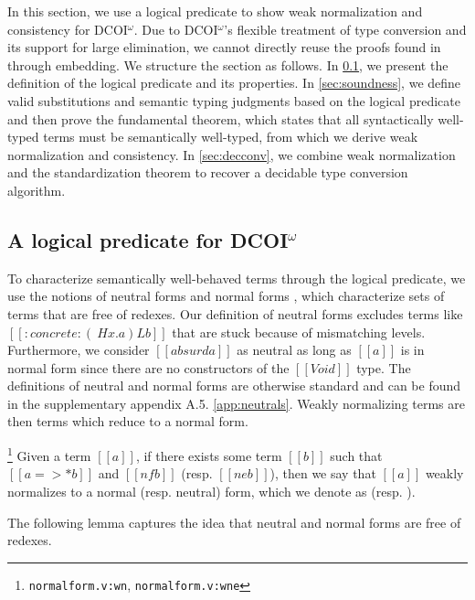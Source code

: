 \documentclass[acmsmall, screen=true, nonacm=true,
  review=\ifpublic false\else true\fi,
  anonymous=\ifanonymous true\else false\fi
]{acmart}
\makeatletter
\newcommand{\name}{\texorpdfstring{DCOI$^{\omega}$\@\xspace}{DCOI-omega}}
\newcommand{\suppl}[3]{{\scriptsize\texttt{#2:#3}}}
\newcommand{\judgement}[1]{{\setlength{\fboxsep}{1.5pt}\fbox{#1}}}
\newlength{\punctwidth}
\newcommand{\stack}[1]{%
  \settowidth{\punctwidth}{#1}%
  \hspace*{-\the\punctwidth}%
}
\makeatother
\begin{document}
In this section, we use a logical predicate to show weak
normalization and consistency for \name.
Due to \name{}'s flexible treatment of type conversion
and its support for large elimination, we cannot directly reuse the
proofs found in \citet{abel:irrelevance, geuvers:cc-sn} through embedding.
We structure the section as follows. In \cref{sec:logpred}, we
present the definition of the logical predicate and its properties. In
\cref{sec:soundness}, we define valid substitutions and
semantic typing judgments based on the logical predicate and then
prove the fundamental theorem, which states that all syntactically
well-typed terms must be semantically well-typed, from which we derive
weak normalization and consistency. In \cref{sec:decconv}, we combine
weak normalization and the standardization theorem to recover a decidable
type conversion algorithm.

\subsection{A logical predicate for \name}
\label{sec:logpred}

To characterize semantically well-behaved terms through the logical predicate,
we use the notions of neutral forms \judgement{$[[ne a]]$}
and normal forms \judgement{$[[nf a]]$},
which characterize sets of terms that are free of redexes. Our
definition of neutral forms excludes terms like $[[:concrete: (\ H x
. a) L b]]$ that are stuck because of mismatching levels.
Furthermore, we consider $[[absurd a]]$ as neutral as long as $[[a]]$
is in normal form since there are no constructors of the $[[Void]]$
type. The definitions of neutral and normal forms are otherwise
standard and can be found in
\ifsubmission the supplementary appendix A.5.
\else \cref{app:neutrals}.
\fi
Weakly normalizing terms are then terms which reduce to a normal form.

\begin{definition}
  \stack{.~}\footnote{\suppl{theories}{normalform.v}{wn}, \suppl{theories}{normalform.v}{wne}}
  Given a term $[[a]]$, if there exists some term $[[b]]$ such that
  $[[a =>* b]]$ and $[[nf b]]$ (resp. $[[ne b]]$),
  then we say that $[[a]]$ weakly normalizes to a
  normal (resp. neutral) form, which we denote as
  \judgement{$[[wnf a]]$} (resp. \judgement{$[[wne a]]$}).
\end{definition}

The following lemma captures the idea that neutral and normal forms
are free of redexes.
\end{document}
